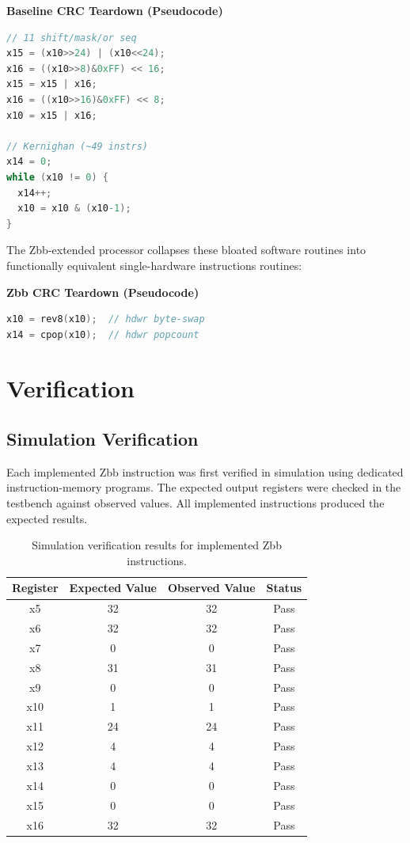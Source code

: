 \documentclass[conference]{IEEEtran}
\begin{document}
\noindent\textbf{Baseline CRC Teardown (Pseudocode)}
\begin{lstlisting}[language=C]
// 11 shift/mask/or seq
x15 = (x10>>24) | (x10<<24);
x16 = ((x10>>8)&0xFF) << 16;
x15 = x15 | x16;
x16 = ((x10>>16)&0xFF) << 8;
x10 = x15 | x16;

// Kernighan (~49 instrs)
x14 = 0;
while (x10 != 0) {
  x14++;
  x10 = x10 & (x10-1);
}
\end{lstlisting}
	
	The Zbb-extended processor collapses these bloated software routines into functionally equivalent single-hardware instructions routines:

\noindent\textbf{Zbb CRC Teardown (Pseudocode)}
\begin{lstlisting}[language=C]
x10 = rev8(x10);  // hdwr byte-swap
x14 = cpop(x10);  // hdwr popcount
\end{lstlisting}
	
	\section{Verification}
	\subsection{Simulation Verification}
	Each implemented Zbb instruction was first verified in simulation using dedicated instruction-memory programs. The expected output registers were checked in the testbench against observed values. All implemented instructions produced the expected results.
	
	\begin{table}[H]
		\centering
		\caption{Simulation verification results for implemented Zbb instructions.}
		\label{tab:sim_verification}
		\begin{tabular}{cccc}
			\toprule
			\textbf{Register} & \textbf{Expected Value} & \textbf{Observed Value} & \textbf{Status} \\
			\midrule
			x5  & 32 & 32 & Pass \\
			x6  & 32 & 32 & Pass \\
			x7  & 0  & 0  & Pass \\
			x8  & 31 & 31 & Pass \\
			x9  & 0  & 0  & Pass \\
			x10 & 1  & 1  & Pass \\
			x11 & 24 & 24 & Pass \\
			x12 & 4  & 4  & Pass \\
			x13 & 4  & 4  & Pass \\
			x14 & 0  & 0  & Pass \\
			x15 & 0  & 0  & Pass \\
			x16 & 32 & 32 & Pass \\
			\bottomrule
		\end{tabular}
	\end{table}
	
\end{document}
